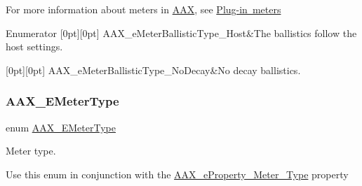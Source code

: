 For more information about meters in \mbox{\hyperlink{a00852}{A\+AX}}, see \mbox{\hyperlink{a00807}{Plug-\/in meters}} \begin{DoxyEnumFields}{Enumerator}
[0pt][0pt]{}\mbox{\label{a00491_a9aaedbe356691c4e4584fa7ccdbcc776af3d4aa787364b763f5396545a8b9e2d4}} 
A\+A\+X\+\_\+e\+Meter\+Ballistic\+Type\+\_\+\+Host&The ballistics follow the host settings. \\
\hline

[0pt][0pt]{}\mbox{\label{a00491_a9aaedbe356691c4e4584fa7ccdbcc776afd1c5e8f175325ec4f7b377f8db14657}} 
A\+A\+X\+\_\+e\+Meter\+Ballistic\+Type\+\_\+\+No\+Decay&No decay ballistics. \\
\hline

\end{DoxyEnumFields}
\mbox{\label{a00491_a590815545eaf0d3be0bb8f656fe2a761}} 
\subsubsection{\texorpdfstring{AAX\_EMeterType}{AAX\_EMeterType}}
{\footnotesize\ttfamily enum \mbox{\hyperlink{a00491_a590815545eaf0d3be0bb8f656fe2a761}{A\+A\+X\+\_\+\+E\+Meter\+Type}}}



Meter type. 

Use this enum in conjunction with the \mbox{\hyperlink{a00662_a13e384f22825afd3db6d68395b79ce0da70c5dbea78be92b053eec1719cb39569}{A\+A\+X\+\_\+e\+Property\+\_\+\+Meter\+\_\+\+Type}} property

